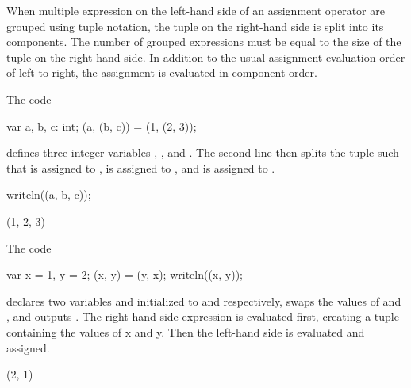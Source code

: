 When multiple expression on the left-hand side of an assignment
operator are grouped using tuple notation, the tuple on the right-hand
side is split into its components.  The number of grouped expressions
must be equal to the size of the tuple on the right-hand side.  In
addition to the usual assignment evaluation order of left to right,
the assignment is evaluated in component order.

\begin{example}
\begin{chapelpre}
\end{chapelpre}
The code
\begin{chapel}
var a, b, c: int;
(a, (b, c)) = (1, (2, 3));
\end{chapel}
defines three integer variables , , and .  The
second line then splits the tuple  such that 
is assigned to ,  is assigned to ,
and  is assigned to .
\begin{chapelpost}
writeln((a, b, c));
\end{chapelpost}
\begin{chapeloutput}
(1, 2, 3)
\end{chapeloutput}
\end{example}

\begin{example}
\begin{chapelpre}
\end{chapelpre}
The code
\begin{chapel}
var x = 1, y = 2;
(x, y) = (y, x);
writeln((x, y));
\end{chapel}
declares two variables  and  initialized to 
and  respectively, swaps the values of  and ,
and outputs .  The right-hand side expression is
evaluated first, creating a tuple containing the values of x and y.
Then the left-hand side is evaluated and assigned.
\begin{chapelpost}
\end{chapelpost}
\begin{chapeloutput}
(2, 1)
\end{chapeloutput}
\end{example}

